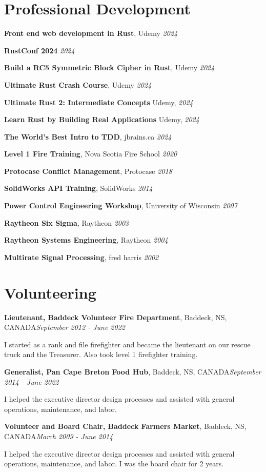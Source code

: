 \documentclass[letter,11pt]{article}
\newenvironment{noindentblock}{%
  \begin{list}{}{%
    \setlength{\leftmargin}{0in} %
    \setlength{\rightmargin}{.25in} %
    \setlength{\topsep}{0pt} %
    \setlength{\parsep}{0pt} %
  }
  \item[]}{\end{list}}
\begin{document}
\section*{Professional Development}
\noindent
\textbf{Front end web development in Rust}, Udemy \hfill \textit{2024}

\noindent
\textbf{RustConf 2024} \hfill \textit{2024}

\noindent
\textbf{Build a RC5 Symmetric Block Cipher in Rust}, Udemy \hfill \textit{2024}

\noindent
\textbf{Ultimate Rust Crash Course}, Udemy \hfill \textit{2024}

\noindent
\textbf{Ultimate Rust 2: Intermediate Concepts} Udemy, \hfill \textit{2024}

\noindent
\textbf{Learn Rust by Building Real Applications} Udemy, \hfill \textit{2024}

\noindent
\textbf{The World's Best Intro to TDD}, jbrains.ca \hfill \textit{2024}

\noindent
\textbf{Level 1 Fire Training}, Nova Scotia Fire School \hfill \textit{2020}

\noindent
\textbf{Protocase Conflict Management}, Protocase \hfill \textit{2018}

\noindent
\textbf{SolidWorks API Training}, SolidWorks \hfill \textit{2014}

\noindent
\textbf{Power Control Engineering Workshop}, University of Wisconsin \hfill \textit{2007}

\noindent
\textbf{Raytheon Six Sigma}, Raytheon \hfill \textit{2003}

\noindent
\textbf{Raytheon Systems Engineering}, Raytheon \hfill \textit{2004}

\noindent
\textbf{Multirate Signal Processing}, fred harris \hfill \textit{2002}

\section*{Volunteering}
\noindent
\textbf{Lieutenant, Baddeck Volunteer Fire Department}, Baddeck, NS, CANADA\hfill \textit{September 2012 - June 2022}
\begin{noindentblock}
  I started as a rank and file firefighter and became the lieutenant on our rescue truck and the Treasurer. Also took level 1 firefighter training.
\end{noindentblock}

\noindent
\textbf{Generalist, Pan Cape Breton Food Hub}, Baddeck, NS, CANADA\hfill \textit{September 2014 - June 2022}
\begin{noindentblock}
  I helped the executive director design processes and assisted with general operations, maintenance, and labor.
\end{noindentblock}

\noindent
\textbf{Volunteer and Board Chair, Baddeck Farmers Market}, Baddeck, NS, CANADA\hfill \textit{March 2009 - June 2014}
\begin{noindentblock}
  I helped the executive director design processes and assisted with general operations, maintenance, and labor. I was the board chair for 2 years.
\end{noindentblock}
\end{document}
